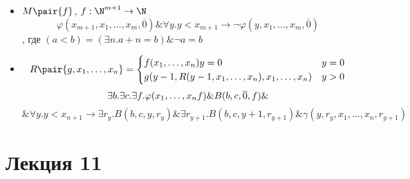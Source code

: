 \documentclass[oneside]{book}
\renewcommand{\leftmark}{}
\begin{document}
\begin{remark}
	\-
	\begin{itemize}
		\item \(M\pair{f}\),  \(f: \N^{m + 1} \to \N\)
		      \[ \varphi(x_{m + 1}, x_1, \dots, x_m, \overline{0}) \& \forall y. y < x_{m + 1} \to \neg \varphi(y, x_1, \dots, x_m, \overline{0}) \]
		      , где \((a < b) = (\exists n. a+ n = b)\&\neg a = b\)
		\item \[R\pair{g, x_1, \dots, x_n}  = \begin{cases}
				      f(x_1, \dots, x_n) y = 0                             & y = 0 \\
				      g(y - 1, R(y - 1, x_1, \dots, x_n), x_1, \dots, x_n) & y > 0
			      \end{cases}\]
		      \[ \exists b. \exists c. \exists f. \varphi(x_1, \dots, x_n f) \& B(b, c, \overline{0}, f) \& \\ \]
		      \[ \& \forall y. y < x_{n + 1} \to \exists r_{y}. B(b, c, y, r_{y})\&\exists r_{y + 1}. B(b, c, y + 1, r_{y + 1})\&\gamma(y, r_{y}, x_1, \dots, x_n, r_{y + 1}) \]
	\end{itemize}
	\label{org3217e8c}
\end{remark}
\chapter*{Лекция 11}\renewcommand{\leftmark}{Лекция 11}
\label{sec:orga1a1abb}
\end{document}
